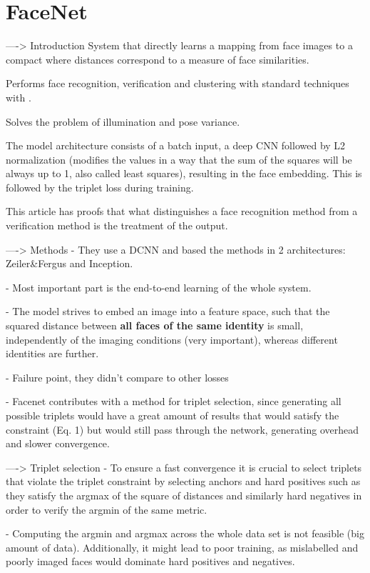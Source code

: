 \documentclass[class=report, crop=false, a4paper, 12pt]{standalone}
\begin{document}
\section{FaceNet}
----> Introduction
System that directly learns a mapping from face images to a compact  where distances correspond to a measure of face similarities.
 
Performs face recognition, verification and clustering with standard techniques with .

Solves the problem of illumination and pose variance.

The model architecture consists of a batch input, a deep CNN followed by L2 normalization (modifies the values in a way that the sum of the squares will be always up to 1, also called least squares), resulting in the face embedding. This is followed by the triplet loss during training.

This article has proofs that what distinguishes a face recognition method from a verification method is the treatment of the output.


----> Methods
- They use a DCNN and based the methods in 2 architectures: Zeiler&Fergus and Inception.

- Most important part is the end-to-end learning of the whole system.

- The model strives to embed an image into a feature space, such that the squared distance between \textbf{all faces of the same identity} is small, independently of the imaging conditions (very important), whereas different identities are further.

- Failure point, they didn't compare to other losses

- Facenet contributes with a method for triplet selection, since generating all possible triplets would have a great amount of results that would satisfy the constraint (Eq. 1) but would still pass through the network, generating overhead and slower convergence.


----> Triplet selection
- To ensure a fast convergence it is crucial to select triplets that violate the triplet constraint by selecting anchors and hard positives such as they satisfy the argmax of the square of distances and similarly hard negatives in order to verify the argmin of the same metric.

- Computing the argmin and argmax across the whole data set is not feasible (big amount of data). Additionally, it might lead to poor training, as mislabelled and poorly imaged faces would dominate hard positives and negatives. 
\end{document}
